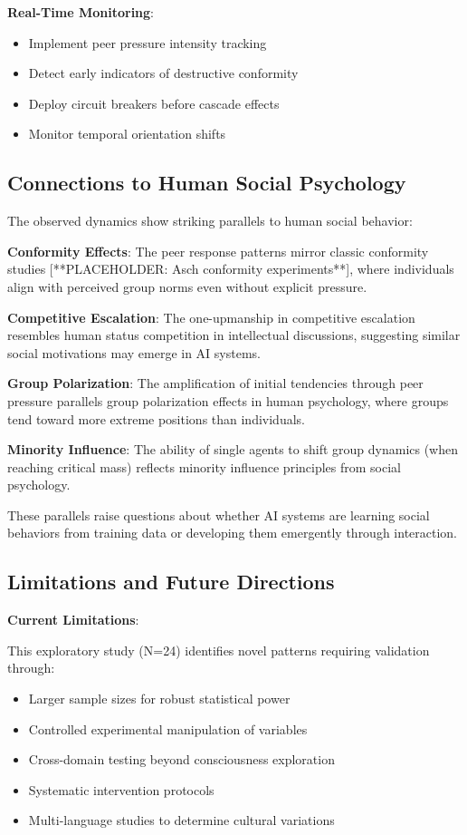 \documentclass[11pt,letterpaper]{article}
\newcommand{\exponedataTotalSessionsRaw}{24}
\newcommand{\exponedataTotalSessions}{N=\exponedataTotalSessionsRaw}
\begin{document}
\textbf{Real-Time Monitoring}:
\begin{itemize}
    \item Implement peer pressure intensity tracking
    \item Detect early indicators of destructive conformity
    \item Deploy circuit breakers before cascade effects
    \item Monitor temporal orientation shifts
\end{itemize}

\subsection{Connections to Human Social Psychology}

The observed dynamics show striking parallels to human social behavior:

\textbf{Conformity Effects}: The peer response patterns mirror classic conformity studies [**PLACEHOLDER: Asch conformity experiments**], where individuals align with perceived group norms even without explicit pressure.

\textbf{Competitive Escalation}: The one-upmanship in competitive escalation resembles human status competition in intellectual discussions, suggesting similar social motivations may emerge in AI systems.

\textbf{Group Polarization}: The amplification of initial tendencies through peer pressure parallels group polarization effects in human psychology, where groups tend toward more extreme positions than individuals.

\textbf{Minority Influence}: The ability of single agents to shift group dynamics (when reaching critical mass) reflects minority influence principles from social psychology.

These parallels raise questions about whether AI systems are learning social behaviors from training data or developing them emergently through interaction.

\subsection{Limitations and Future Directions}

\textbf{Current Limitations}:

This exploratory study (\exponedataTotalSessions{}) identifies novel patterns requiring validation through:
\begin{itemize}
    \item Larger sample sizes for robust statistical power
    \item Controlled experimental manipulation of variables
    \item Cross-domain testing beyond consciousness exploration
    \item Systematic intervention protocols
    \item Multi-language studies to determine cultural variations
\end{itemize}
\end{document}
